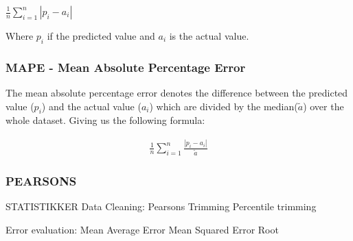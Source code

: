  $ \frac{1}{n}\sum_{i=1}^{n}|p_i-a_i| $

 Where $p_i$ if the predicted value and $a_i$ is the actual value.

\subsubsection{MAPE - Mean Absolute Percentage Error}
The mean absolute percentage error denotes the difference between the predicted value ($p_i$) and the actual value ($a_i$) which are divided by the median($\tilde{a}$) over the whole dataset. Giving us the following formula:

\begin{align*}
\frac{1}{n}\sum_{i=1}^{n}\frac{|p_i-a_i|}{\tilde{a}}
\end{align*}


\subsubsection{PEARSONS} \label{sec:Pearsons}


STATISTIKKER
	Data Cleaning:
		Pearsons
		Trimming
		Percentile trimming

	Error evaluation:
		Mean Average Error
		Mean Squared Error
		Root 
